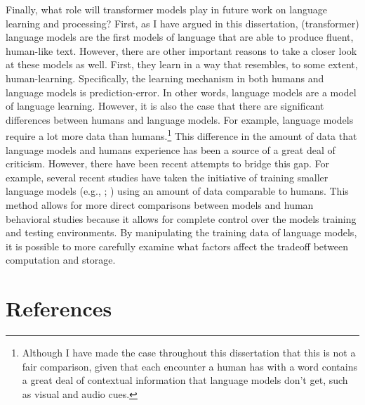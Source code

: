 \documentclass[
  12pt,
  letterpaper,
]{scrreport}
\begin{document}
Finally, what role will transformer models play in future work on
language learning and processing? First, as I have argued in this
dissertation, (transformer) language models are the first models of
language that are able to produce fluent, human-like text. However,
there are other important reasons to take a closer look at these models
as well. First, they learn in a way that resembles, to some extent,
human-learning. Specifically, the learning mechanism in both humans and
language models is prediction-error. In other words, language models are
a model of language learning. However, it is also the case that there
are significant differences between humans and language models. For
example, language models require a lot more data than humans.\footnote{Although
  I have made the case throughout this dissertation that this is not a
  fair comparison, given that each encounter a human has with a word
  contains a great deal of contextual information that language models
  don't get, such as visual and audio cues.} This difference in the
amount of data that language models and humans experience has been a
source of a great deal of criticism. However, there have been recent
attempts to bridge this gap. For example, several recent studies have
taken the initiative of training smaller language models (e.g.,
;
) using an
amount of data comparable to humans. This method allows for more direct
comparisons between models and human behavioral studies because it
allows for complete control over the models training and testing
environments. By manipulating the training data of language models, it
is possible to more carefully examine what factors affect the tradeoff
between computation and storage.


\chapter*{References}\label{references}


\begingroup
\raggedright
\end{document}

